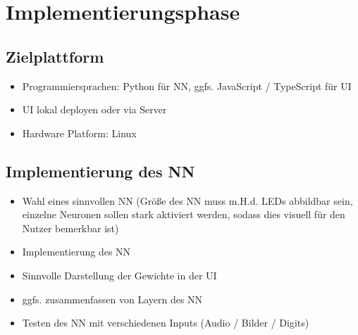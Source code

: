 \clearpage
\section{Implementierungsphase} 
\label{sec:Implementierungsphase}

\subsection{Zielplattform}
\label{sec:Zielplattform}

\begin{itemize}
	\item Programmiersprachen: Python f\"ur NN, ggfs. JavaScript / TypeScript f\"ur UI
	\item UI lokal deployen oder via Server
	\item Hardware Platform: Linux
\end{itemize}
%
%
%
\subsection{Implementierung des NN}
\label{sec:ImplementierungNN}

\begin{itemize}
	\item Wahl eines sinnvollen NN (Gr\"o{\ss}e des NN muss m.H.d. LEDs abbildbar sein, einzelne Neuronen sollen stark aktiviert werden, sodass dies visuell f\"ur den Nutzer bemerkbar ist) 
	\item Implementierung des NN
	\item Sinnvolle Darstellung der Gewichte in der UI
	\item ggfs. zusammenfassen von Layern des NN
	\item Testen des NN mit verschiedenen Inputs (Audio / Bilder / Digits)
\end{itemize}


